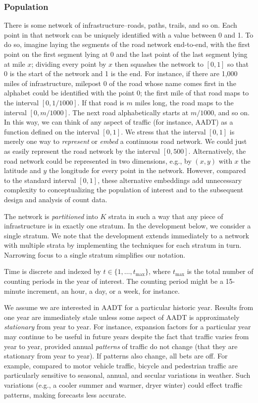 \documentclass[11pt]{article}
\begin{document}
    \subsubsection{Population}\label{population}

There is some network of infrastructure--roads, paths, trails, and so
on. Each point in that network can be uniquely identified with a value
between 0 and 1. To do so, imagine laying the segments of the road
network end-to-end, with the first point on the first segment lying at 0
and the last point of the last segment lying at mile \(x\); dividing
every point by \(x\) then squashes the network to \([0,1]\) so that 0 is
the start of the network and 1 is the end. For instance, if there are
1,000 miles of infrastructure, milepost 0 of the road whose name comes
first in the alphabet could be identified with the point 0; the first
mile of that road maps to the interval \([0, 1/1000]\). If that road is
\(m\) miles long, the road maps to the interval \([0, m/1000]\). The
next road alphabetically starts at \(m/1000\), and so on. In this way,
we can think of any aspect of traffic (for instance, AADT) as a function
defined on the interval \([0, 1]\). We stress that the interval
\([0,1]\) is merely one way to \emph{represent} or \emph{embed} a
continuous road network. We could just as easily represent the road
network by the interval \([0,500]\). Alternatively, the road network
could be represented in two dimensions, e.g., by \((x,y)\) with \(x\)
the latitude and \(y\) the longitude for every point in the network.
However, compared to the standard interval \([0,1]\), these alternative
embeddings add unnecessary complexity to conceptualizing the population
of interest and to the subsequent design and analysis of count data.

The network is \emph{partitioned} into \(K\) strata in such a way that
any piece of infrastructure is in exactly one stratum. In the
development below, we consider a single stratum. We note that the
development extends immediately to a network with multiple strata by
implementing the techniques for each stratum in turn. Narrowing focus to
a single stratum simplifies our notation.

Time is discrete and indexed by \(t \in \{1,\ldots, t_{\max}\}\), where
\(t_{\max}\) is the total number of counting periods in the year of
interest. The counting period might be a 15-minute increment, an hour, a
day, or a week, for instance.

We assume we are interested in AADT for a particular historic year.
Results from one year are immediately stale unless some aspect of AADT
is approximately \emph{stationary} from year to year. For instance,
expansion factors for a particular year may continue to be useful in
future years despite the fact that traffic varies from year to year,
provided annual \emph{patterns} of traffic do not change (that they are
stationary from year to year). If patterns also change, all bets are
off. For example, compared to motor vehicle traffic, bicycle and
pedestrian traffic are particularly sensitive to seasonal, annual, and
secular variations in weather. Such variations (e.g., a cooler summer
and warmer, dryer winter) could effect traffic patterns, making
forecasts less accurate.
\end{document}
